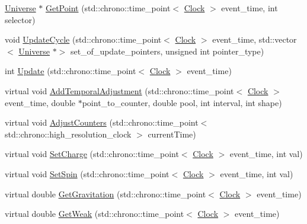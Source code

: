 \begin{DoxyCompactItemize}
\item 
\hyperlink{class_universe}{Universe} $\ast$ \hyperlink{class_universe_a3774f14a13a55827a1a4eea0a404edcb}{Get\+Point} (std\+::chrono\+::time\+\_\+point$<$ \hyperlink{universe_8h_a0ef8d951d1ca5ab3cfaf7ab4c7a6fd80}{Clock} $>$ event\+\_\+time, int selector)
\item 
void \hyperlink{class_universe_a0d79e614e1af951c06b78cb5768f9c8e}{Update\+Cycle} (std\+::chrono\+::time\+\_\+point$<$ \hyperlink{universe_8h_a0ef8d951d1ca5ab3cfaf7ab4c7a6fd80}{Clock} $>$ event\+\_\+time, std\+::vector$<$ \hyperlink{class_universe}{Universe} $\ast$$>$ set\+\_\+of\+\_\+update\+\_\+pointers, unsigned int pointer\+\_\+type)
\item 
int \hyperlink{class_universe_a64ee5a2c7e86c56fa426acb750438ce9}{Update} (std\+::chrono\+::time\+\_\+point$<$ \hyperlink{universe_8h_a0ef8d951d1ca5ab3cfaf7ab4c7a6fd80}{Clock} $>$ event\+\_\+time)
\item 
virtual void \hyperlink{class_universe_a901e16db5e8af258c66af7ac75662fe0}{Add\+Temporal\+Adjustment} (std\+::chrono\+::time\+\_\+point$<$ \hyperlink{universe_8h_a0ef8d951d1ca5ab3cfaf7ab4c7a6fd80}{Clock} $>$ event\+\_\+time, double $\ast$point\+\_\+to\+\_\+counter, double pool, int interval, int shape)
\item 
virtual void \hyperlink{class_universe_a15aa20218286fd11ecb9b792dfb63be3}{Adjust\+Counters} (std\+::chrono\+::time\+\_\+point$<$ std\+::chrono\+::high\+\_\+resolution\+\_\+clock $>$ current\+Time)
\item 
virtual void \hyperlink{class_universe_a3b3da7c86a7b75e5e5c0b7972ac82a87}{Set\+Charge} (std\+::chrono\+::time\+\_\+point$<$ \hyperlink{universe_8h_a0ef8d951d1ca5ab3cfaf7ab4c7a6fd80}{Clock} $>$ event\+\_\+time, int val)
\item 
virtual void \hyperlink{class_universe_ae2ae1c3b3e4cde2c18f5f6a814761ec8}{Set\+Spin} (std\+::chrono\+::time\+\_\+point$<$ \hyperlink{universe_8h_a0ef8d951d1ca5ab3cfaf7ab4c7a6fd80}{Clock} $>$ event\+\_\+time, int val)
\item 
virtual double \hyperlink{class_universe_ab0404e774ee0ed66b597ff5b8e989446}{Get\+Gravitation} (std\+::chrono\+::time\+\_\+point$<$ \hyperlink{universe_8h_a0ef8d951d1ca5ab3cfaf7ab4c7a6fd80}{Clock} $>$ event\+\_\+time)
\item 
virtual double \hyperlink{class_universe_a4476b7e0a3fc1764909f556257fd9ec7}{Get\+Weak} (std\+::chrono\+::time\+\_\+point$<$ \hyperlink{universe_8h_a0ef8d951d1ca5ab3cfaf7ab4c7a6fd80}{Clock} $>$ event\+\_\+time)
\item 
$$
\end{DoxyCompactItemize}
